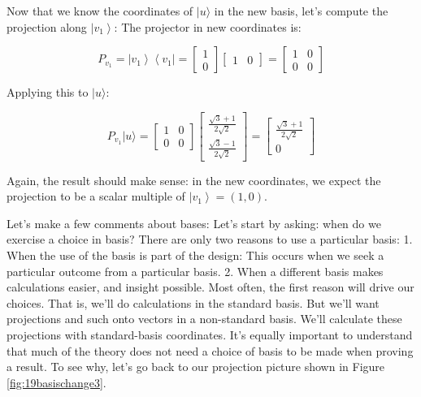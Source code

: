 \documentclass[main.tex]{subfiles}
\begin{document}
    Now that we know the coordinates of $|u\rangle$ in the new basis, let's compute the projection along $\left|v_{1}\right\rangle$: The projector in new coordinates is:
    
    $$
    P_{v_{1}}=\left|v_{1}\right\rangle\left\langle v_{1}\right|=\left[\begin{array}{l}
    1 \\
    0
    \end{array}\right]\left[\begin{array}{ll}
    1 & 0
    \end{array}\right]=\left[\begin{array}{ll}
    1 & 0 \\
    0 & 0
    \end{array}\right]
    $$
    
    Applying this to $|u\rangle$:
    
    $$
    P_{v_{1}}|u\rangle=\left[\begin{array}{ll}
    1 & 0 \\
    0 & 0
    \end{array}\right]\left[\begin{array}{c}
    \frac{\sqrt{3}+1}{2 \sqrt{2}} \\
    \frac{\sqrt{3}-1}{2 \sqrt{2}}
    \end{array}\right]=\left[\begin{array}{c}
    \frac{\sqrt{3}+1}{2 \sqrt{2}} \\
    0
    \end{array}\right]
    $$
    
    Again, the result should make sense: in the new coordinates, we expect the projection to be a scalar multiple of $\left|v_{1}\right\rangle=(1,0)$.
    
    Let's make a few comments about bases: Let's start by asking: when do we exercise a choice in basis? There are only two reasons to use a particular basis: 1. When the use of the basis is part of the design: This occurs when we seek a particular outcome from a particular basis. 2. When a different basis makes calculations easier, and insight possible. Most often, the first reason will drive our choices. That is, we'll do calculations in the standard basis. But we'll want projections and such onto vectors in a non-standard basis. We'll calculate these projections with standard-basis coordinates. It's equally important to understand that much of the theory does not need a choice of basis to be made when proving a result. To see why, let's go back to our projection picture shown in Figure \ref{fig:19basischange3}.
\end{document}
